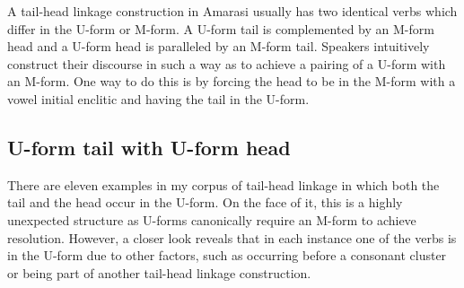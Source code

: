 \begin{exe}
\end{exe}

A tail-head linkage construction in Amarasi usually
has two identical verbs which differ in the U-form or M-form.
A U-form tail is complemented by an M-form head
and a U-form head is paralleled by an M-form tail.
Speakers intuitively construct their discourse in such
a way as to achieve a pairing of a U-form with an M-form.
One way to do this is by forcing the head to be in the M-form
with a vowel initial enclitic and having the tail in the U-form.

\subsection{U-form tail with U-form head}\label{sec:UforTaiUforHea}
There are eleven examples in my corpus of tail-head linkage
in which both the tail and the head occur in the U-form.
On the face of it, this is a highly unexpected structure
as U-forms canonically require an M-form to achieve resolution.
However, a closer look reveals that in each instance one of the verbs is in the U-form due to
other factors, such as occurring before a consonant cluster
or being part of another tail-head linkage construction.

